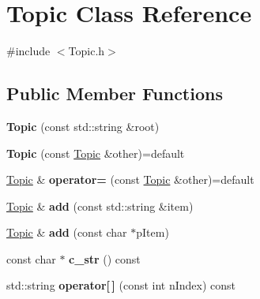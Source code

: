 \hypertarget{class_topic}{}\section{Topic Class Reference}
\label{class_topic}


{\ttfamily \#include $<$Topic.\+h$>$}

\subsection*{Public Member Functions}
\begin{DoxyCompactItemize}
\item 
{\bfseries Topic} (const std\+::string \&root)\hypertarget{class_topic_a4e2b337c972d1766c80b48e4981eb47f}{}\label{class_topic_a4e2b337c972d1766c80b48e4981eb47f}

\item 
{\bfseries Topic} (const \hyperlink{class_topic}{Topic} \&other)=default\hypertarget{class_topic_a5650ccda9f2d99bfd54e90e1f92bc7b2}{}\label{class_topic_a5650ccda9f2d99bfd54e90e1f92bc7b2}

\item 
\hyperlink{class_topic}{Topic} \& {\bfseries operator=} (const \hyperlink{class_topic}{Topic} \&other)=default\hypertarget{class_topic_a744c65ee1c771c392945fe1eba061b7d}{}\label{class_topic_a744c65ee1c771c392945fe1eba061b7d}

\item 
\hyperlink{class_topic}{Topic} \& {\bfseries add} (const std\+::string \&item)\hypertarget{class_topic_abce06cc663933929b9636f9c3f1e3a39}{}\label{class_topic_abce06cc663933929b9636f9c3f1e3a39}

\item 
\hyperlink{class_topic}{Topic} \& {\bfseries add} (const char $\ast$p\+Item)\hypertarget{class_topic_a340aa8d9fa92ad882f72f3fdb333a62a}{}\label{class_topic_a340aa8d9fa92ad882f72f3fdb333a62a}

\item 
const char $\ast$ {\bfseries c\+\_\+str} () const \hypertarget{class_topic_a8f11bba4553f3294cc6c88b5608965a8}{}\label{class_topic_a8f11bba4553f3294cc6c88b5608965a8}

\item 
std\+::string {\bfseries operator\mbox{[}$\,$\mbox{]}} (const int n\+Index) const \hypertarget{class_topic_a86750eb909dff0a6970dd05ee7e9b8e0}{}\label{class_topic_a86750eb909dff0a6970dd05ee7e9b8e0}

\end{DoxyCompactItemize}


